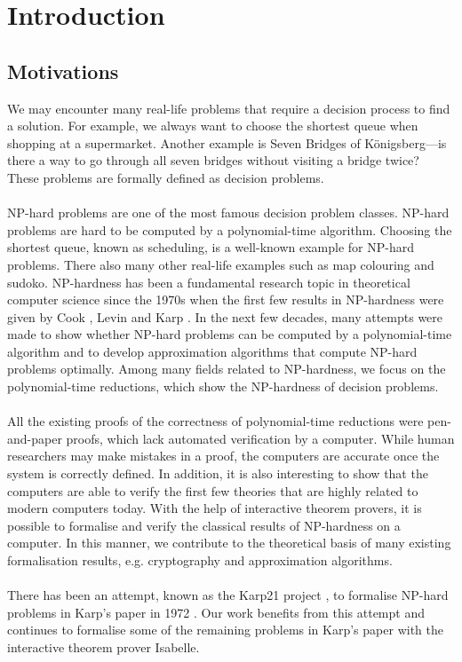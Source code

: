 \chapter{Introduction}\label{chapter:introduction}
\section{Motivations}
We may encounter many real-life problems that require a decision process to find a solution. 
For example, we always want to choose the shortest queue when shopping at a supermarket. 
Another example is Seven Bridges of Königsberg---is there a way to go through all seven bridges 
without visiting a bridge twice? These problems are formally defined as decision problems.\\\\
NP-hard problems are one of the most famous decision problem classes.
NP-hard problems are hard to be computed by a polynomial-time algorithm. Choosing the shortest queue, 
known as scheduling, is a well-known example for NP-hard problems. There also many other real-life examples
such as map colouring and sudoko.
NP-hardness has been a fundamental research topic in theoretical computer science since the 1970s
when the first few results in NP-hardness were given by Cook \cite{cook2023complexity}, Levin \cite{levin1973universal} 
and Karp \cite{karp2010reducibility}. 
In the next few decades, many attempts were made to show whether NP-hard problems can be computed by a polynomial-time algorithm and to develop approximation algorithms that compute NP-hard problems optimally. 
Among many fields related to NP-hardness, we focus on the polynomial-time reductions, which show the NP-hardness of decision problems. \\\\
All the existing proofs of the correctness of polynomial-time reductions were pen-and-paper proofs, 
which lack automated verification by a computer. 
While human researchers may make mistakes in a proof, the computers are accurate once the system is correctly defined. In addition, 
it is also interesting to show that the computers are able to verify the first few theories that are highly related to modern computers today.
With the help of interactive theorem provers, 
it is possible to formalise and verify the classical results of NP-hardness on a computer.
In this manner, we contribute to the theoretical basis of many existing formalisation results, 
e.g. cryptography and approximation algorithms. \\\\ 
There has been an attempt, known as the Karp21 project \cite{polyred}, to formalise NP-hard problems in Karp's paper in 1972 \cite{karp2010reducibility}. 
Our work benefits from this attempt and continues to formalise some of the remaining problems in Karp's paper 
with the interactive theorem prover Isabelle. 


